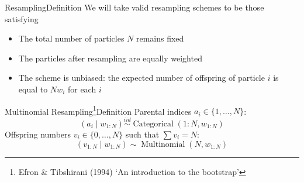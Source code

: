 \documentclass[aspectratio=169]{beamer}
\theoremstyle{definition}
\newcommand{\E}{\mathbb{E}}
\newcommand{\Cat}{\operatorname{Categorical}}
\newcommand{\Mn}{\operatorname{Multinomial}}
\newcommand{\vt}[1]{v_{#1}}
\newcommand{\wt}[1]{w_{#1}}
\begin{document}
\begin{frame}{Resampling}{Definition}
%
We will take valid resampling schemes to be those satisfying
\begin{itemize}
\item The total number of particles $N$ remains fixed
\item The particles after resampling are equally weighted
\item The scheme is unbiased: the expected number of offspring of particle $i$ is equal to $N\wt{i}$ for each $i$
\end{itemize}

\end{frame}


\begin{frame}{Multinomial Resampling\footnote{Efron \& Tibshirani (1994) `An introduction to the bootstrap'}}{Definition}
Parental indices $a_i \in \{1,\dots,N\}$:
\begin{equation*}
(a_{i} \mid \wt{1:N}) \overset{iid}{\sim} \Cat(1:N, \wt{1:N})
\end{equation*}
\pause
Offspring numbers $\vt{i} \in \{0,\dots,N\}$ such that $\sum \vt{i} = N$:
\begin{equation*}
(\vt{1:N} \mid \wt{1:N}) \sim \Mn(N, \wt{1:N})
\end{equation*}

\end{frame}
\end{document}
